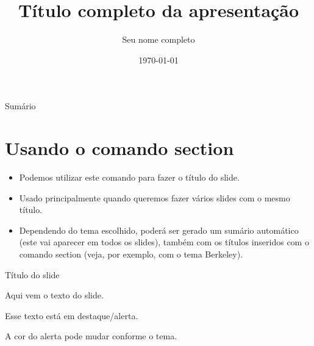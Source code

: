 \documentclass[aspectratio=169]{beamer}
\title[Título curto]{Título completo da apresentação}
\author[Nome abreviado]{Seu nome completo}
\institute[UTFPR]{Universidade Tecnológica Federal do Paraná - UTFPR \\ Campus Curitiba}
\date{\today}
\begin{document}

\begin{frame}
    \titlepage
\end{frame}

\begin{frame}{Sumário}
    \tableofcontents %
\end{frame}

\section{Usando o comando section}
\begin{frame}{\insertsection}
    \begin{itemize}
        \item Podemos utilizar este comando para fazer o título do slide.
        \item Usado principalmente quando queremos fazer vários slides com o mesmo título.
        \item Dependendo do tema escolhido, poderá ser gerado um sumário automático (este vai aparecer em todos os slides), também com os títulos inseridos com o comando section (veja, por exemplo, com o tema Berkeley).
    \end{itemize}
\end{frame}

\begin{frame}{Título do slide} 

    Aqui vem o texto do slide.

    \alert{Esse texto está em destaque/alerta.} 
    
    A cor do alerta pode mudar conforme o tema. 

\end{frame}
\end{document}
